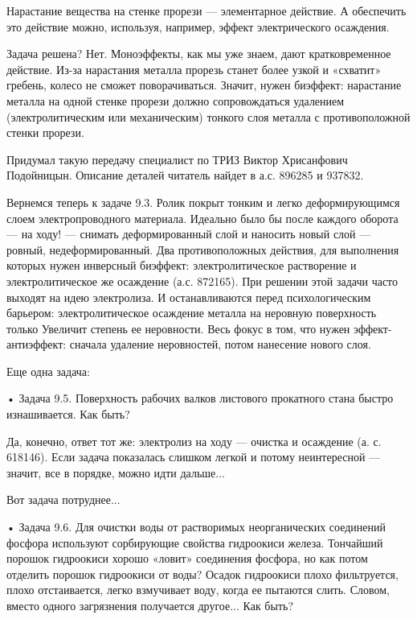 Нарастание  вещества  на  стенке   прорези  —  элементарное  действие.
А  обеспечить   это  действие   можно,  используя,   например,  эффект
электрического осаждения.

Задача   решена?   Нет.   Моноэффекты,   как  мы   уже   знаем,   дают
кратковременное  действие.  Из-за  нарастания металла  прорезь  станет
более  узкой и  «схватит»  гребень, колесо  не сможет  поворачиваться.
Значит,  нужен биэффект:  нарастание металла  на одной  стенке прорези
должно сопровождаться  удалением (электролитическим  или механическим)
тонкого слоя металла с противоположной стенки прорези.

Придумал  такую   передачу  специалист  по  ТРИЗ   Виктор  Хрисанфович
Подойницын. Описание деталей читатель найдет в а.с. 896285 и 937832.


Вернемся  теперь   к  задаче   9.3.  Ролик   покрыт  тонким   и  легко
деформирующимся  слоем электропроводного  материала. Идеально  было бы
после  каждого оборота  — на  ходу! —  снимать деформированный  слой и
наносить новый  слой — ровный, недеформированный.  Два противоположных
действия,   для   выполнения   которых   нужен   инверсный   биэффект:
электролитическое растворение  и электролитическое же  осаждение (а.с.
872165). При  решении этой задачи  часто выходят на  идею электролиза.
И  останавливаются перед  психологическим барьером:  электролитическое
осаждение металла  на неровную поверхность только  Увеличит степень ее
неровности.  Весь фокус  в том,  что нужен  эффект-антиэффект: сначала
удаление неровностей, потом нанесение нового слоя.


Еще одна задача:

• Задача  9.5. Поверхность  рабочих валков листового  прокатного стана
быстро изнашивается. Как быть?

Да, конечно,  ответ тот же: электролиз  на ходу — очистка  и осаждение
(а.  с.  618146).  Если  задача показалась  слишком  легкой  и  потому
неинтересной — значит, все в порядке, можно идти дальше...

Вот задача потруднее...

•  Задача   9.6.  Для  очистки  воды   от  растворимых  неорганических
соединений фосфора используют  сорбирующие свойства гидроокиси железа.
Тончайший порошок гидроокиси хорошо «ловит» соединения фосфора, но как
потом  отделить порошок  гидроокиси от  воды? Осадок  гидроокиси плохо
фильтруется,  плохо  отстаивается,  легко взмучивает  воду,  когда  ее
пытаются слить. Словом, вместо одного загрязнения получается другое...
Как быть?


